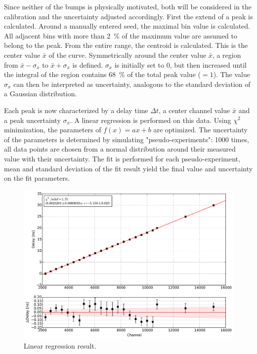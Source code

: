 \documentclass[
	paper=A4,
	parskip=full,
	chapterprefix=true,
	11pt,
	headings=normal,
	bibliography=totoc,
	listof=totoc,
	titlepage=on,
]{scrreprt}
\begin{document}
Since neither of the bumps is physically motivated, both will be considered in the calibration and the uncertainty adjusted accordingly.
First the extend of a peak is calculated. Around a manually entered seed, the maximal bin value is calculated. All adjacent bins with more than \SI{2}{\percent} of the maximum value are assumed to belong to the peak. From the entire range, the centroid is calculated. This is the center value $\bar{x}$ of the curve. Symmetrically around the center value $\bar{x}$, a region from $\bar{x}-\sigma_x$ to $\bar{x}+\sigma_x$ is defined. $\sigma_x$ is initially set to \num{0}, but then increased until the integral of the region contains \SI{68}{\percent} of the total peak value ($ = \num{1}$). The value $\sigma_x$ can then be interpreted as uncertainty, analogous to the standard deviation of a Gaussian distribution.

Each peak is now characterized by a delay time $\Delta t$, a center channel value $\bar{x}$ and a peak uncertainty $\sigma_x$.
A linear regression is performed on this data. Using $\chi^2$ minimization, the parameters of $f(x) = a x + b$ are optimized. 
The uncertainty of the parameters is determined by simulating "pseudo-experiments": \num{1000} times, all data points are chosen from a normal distribution around their measured value with their uncertainty. The fit is performed for each pseudo-experiment, mean and standard deviation of the fit result yield the final value and uncertainty on the fit parameters.

\begin{figure}
	\centering
	\includegraphics{calibration}
	\caption{Linear regression result.}
	\label{fig:calibration_linreg}
\end{figure}
\end{document}
